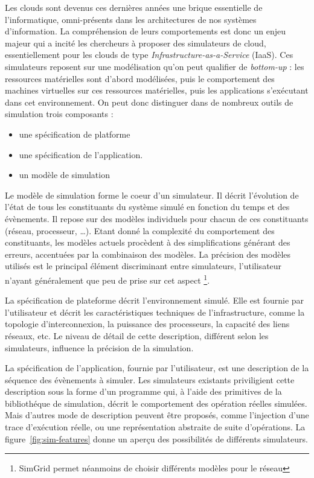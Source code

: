 \documentclass[parallelisme]{compas2017}
\begin{document}
Les  clouds  sont  devenus  ces  dernières  années  une  brique  essentielle  de
l'informatique,   omni-présents  dans   les   architectures   de  nos   systèmes
d'information. La compréhension de leurs  comportements est donc un enjeu majeur
qui a incité les chercheurs à proposer des simulateurs de cloud, essentiellement
pour les clouds de type \textit{Infrastructure-as-a-Service} (IaaS). Ces
simulateurs   reposent   sur   une   modélisation  qu'on   peut   qualifier   de
\textit{bottom-up} : les ressources matérielles sont d'abord modélisées, puis le
comportement des  machines virtuelles sur  ces ressources matérielles,  puis les
applications s'exécutant dans cet environnement. On peut donc distinguer dans 
de nombreux outils de simulation trois composants : 
\begin{itemize}
		\item une spécification de platforme
		\item une spécification de l'application.
		\item un modèle de simulation
\end{itemize}

Le modèle de simulation forme le coeur d'un simulateur. Il décrit l'évolution de
l'état de tous  les constituants du système  simulé en fonction du  temps et des
évènements.   Il  repose  sur  des   modèles  individuels  pour  chacun  de  ces
constituants  (réseau,   processeur,  \ldots).    Etant  donné  la   complexité  du
comportement   des   constituants,  les   modèles   actuels   procèdent  à   des
simplifications  générant  des  erreurs,   accentuées  par  la  combinaison  des
modèles. La précision des modèles utilisés est le principal élément discriminant
entre simulateurs, l'utilisateur  n'ayant généralement que peu de  prise sur cet
aspect%
\footnote{SimGrid  permet  néanmoins de  choisir  différents  modèles pour le réseau}.

La spécification de plateforme décrit  l'environnement simulé.  Elle est fournie
par l'utilisateur et décrit les caractéristiques techniques de l'infrastructure,
comme la topologie  d'interconnexion, la puissance des  processeurs, la capacité
des liens  réseaux, etc.  Le niveau  de détail  de cette  description, différent
selon les simulateurs, influence la précision de la simulation.

La  spécification   de  l'application,   fournie  par  l'utilisateur,   est  une
description de la  séquence des évènements à simuler.  Les simulateurs existants
priviligient cette  description sous la forme  d'un programme qui, à  l'aide des
primitives  de  la  bibliothéque  de  simulation,  décrit  le  comportement  des
opération  réelles simulées.   Mais d'autres  mode de  description peuvent  être
proposés,   comme   l'injection  d'une   trace   d'exécution   réelle,  ou   une
représentation abstraite de suite d'opérations. La figure~\ref{fig:sim-features}
donne un aperçu des possibilités de différents simulateurs.
\end{document}
